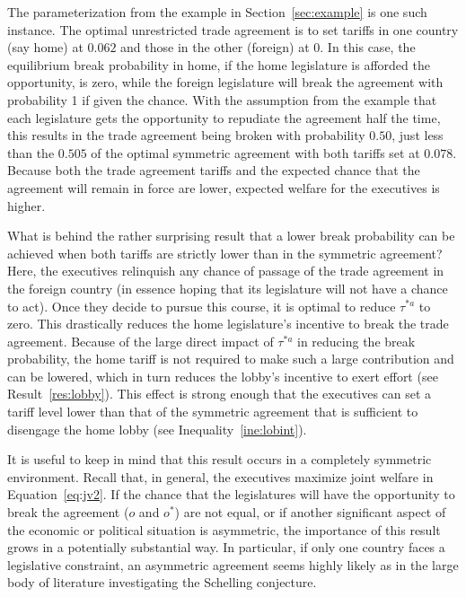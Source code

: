\documentclass[10pt]{article}
\begin{document}
The parameterization from the example in Section~\ref{sec:example} is one such instance. The optimal unrestricted trade agreement is to set tariffs in one country (say home) at $0.062$ and those in the other (foreign) at 0. In this case, the equilibrium break probability in home, if the home legislature is afforded the opportunity, is zero, while the foreign legislature will break the agreement with probability 1 if given the chance. With the assumption from the example that each legislature gets the opportunity to repudiate the agreement half the time, this results in the trade agreement being broken with probability $0.50$, just less than the $0.505$ of the optimal symmetric agreement with both tariffs set at $0.078$. Because both the trade agreement tariffs and the expected chance that the agreement will remain in force are lower, expected welfare for the executives is higher.

What is behind the rather surprising result that a lower break probability can be achieved when both tariffs are strictly lower than in the symmetric agreement? Here, the executives relinquish any chance of passage of the trade agreement in the foreign country (in essence hoping that its legislature will not have a chance to act). Once they decide to pursue this course, it is optimal to reduce $\tau^{*a}$ to zero. This drastically reduces the home legislature's incentive to break the trade agreement. Because of the large direct impact of $\tau^{*a}$ in reducing the break probability, the home tariff is not required to make such a large contribution and can be lowered, which in turn reduces the lobby's incentive to exert effort (see Result~\ref{res:lobby}). This effect is strong enough that the executives can set a tariff level lower than that of the symmetric agreement that is sufficient to disengage the home lobby (see Inequality~\ref{ine:lobint}). 

It is useful to keep in mind that this result occurs in a completely symmetric environment. Recall that, in general, the executives maximize joint welfare in Equation~\ref{eq:jv2}. If the chance that the legislatures will have the opportunity to break the agreement ($o$ and $o^*$) are not equal, or if another significant aspect of the economic or political situation is asymmetric, the importance of this result grows in a potentially substantial way. In particular, if only one country faces a legislative constraint, an asymmetric agreement seems highly likely as in the large body of literature investigating the Schelling conjecture.
\end{document}
